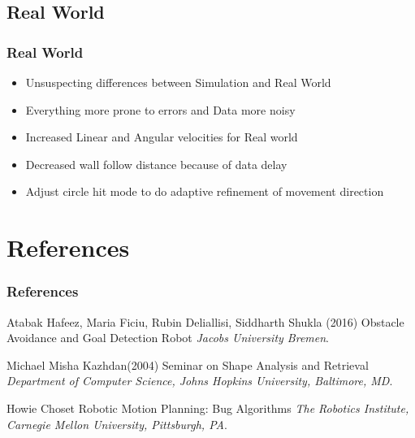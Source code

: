 \documentclass{beamer}
\begin{document}
\subsection{Real World}

\begin{frame}
\frametitle{Real World}
\begin{itemize}
\item Unsuspecting differences between Simulation and Real World
\item Everything more prone to errors and Data more noisy
\item Increased Linear and Angular velocities for Real world
\item Decreased wall follow distance because of data delay
\item Adjust circle hit mode to do adaptive refinement of movement direction
\end{itemize}
\end{frame}

\section{References}
\begin{frame}
\frametitle{References}
\footnotesize{
\begin{thebibliography}{99} %
 Atabak Hafeez, Maria Ficiu, Rubin Deliallisi, Siddharth Shukla (2016)
\newblock Obstacle Avoidance and Goal Detection Robot
\newblock \emph{Jacobs University Bremen}.

 Michael Misha Kazhdan(2004)
\newblock Seminar on Shape Analysis and Retrieval
\newblock \emph{Department of Computer Science,
Johns Hopkins University, Baltimore, MD}.

 Howie Choset
\newblock Robotic Motion Planning: Bug Algorithms
\newblock \emph{The Robotics Institute,
Carnegie Mellon University, Pittsburgh, PA}.

\end{thebibliography}
}
\end{frame}

\end{document}
